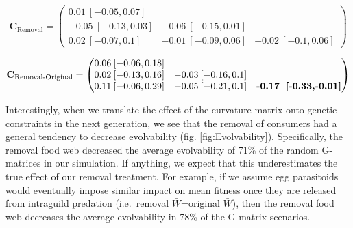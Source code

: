 \documentclass[11pt,]{article}
\begin{document}
\[\textbf{C}_{\text{Removal}} = \begin{pmatrix} 
0.01\: [-0.05,0.07] &  &  \\  
-0.05\: [-0.13,0.03] & -0.06\: [-0.15,0.01] &  \\  
0.02\: [-0.07,0.1] & -0.01\: [-0.09,0.06] & -0.02\: [-0.1,0.06] \end{pmatrix}\]

\[\textbf{C}_{\text{Removal-Original}} = \begin{pmatrix} 
0.06\: [-0.06,0.18] &  &  \\  
0.02\: [-0.13,0.16] & -0.03\: [-0.16,0.1] &  \\  
0.11\: [-0.06,0.29] & -0.05\: [-0.21,0.1] & \textbf{-0.17\: [-0.33,-0.01]} \end{pmatrix}\]

Interestingly, when we translate the effect of the curvature matrix onto
genetic constraints in the next generation, we see that the removal of
consumers had a general tendency to decrease evolvability (fig.
\ref{fig:Evolvability}). Specifically, the removal food web decreased
the average evolvability of 71\% of the random G-matrices in our
simulation. If anything, we expect that this underestimates the true
effect of our removal treatment. For example, if we assume egg
parasitoids would eventually impose similar impact on mean fitness once
they are released from intraguild predation (i.e.~removal
\(\bar W\)=original \(\bar W\)), then the removal food web decreases the
average evolvability in 78\% of the G-matrix scenarios.

\bigskip
\end{document}
